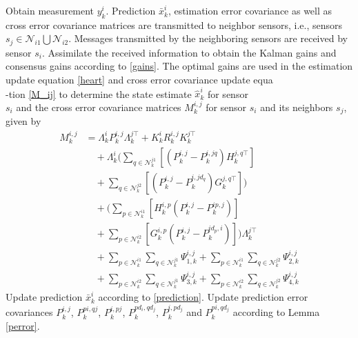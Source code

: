 \documentclass[twocolumn]{IEEEtran}
\begin{document}
\begin{algorithm}\label{filter-algorithm}
\caption{Optimal Kalman Consensus Filter for Weighted Directed Graphs (for sensor $s_i$)}
\begin{algorithmic}[1]
\STATE Obtain measurement $y_{k}^{i}$.
\STATE Prediction $\bar{x}_{k}^{i}$, estimation error covariance as well as cross error covariance matrices are transmitted to neighbor sensors, i.e., sensors $s_j \in \mathcal{N}_{i1}\bigcup\mathcal{N}_{i2}$.
\STATE Messages transmitted by the neighboring sensors are received by sensor $s_i$.
\STATE Assimilate the received information to obtain the Kalman gains and consensus gains according to \eqref{gains}.
\STATE The optimal gains are used in the estimation update equation \eqref{heart} and cross error covariance update equa\\-tion \eqref{M_ij} to determine the state estimate $\hat{x}_{k}^{i}$ for sensor\\ $s_i$ and the cross error covariance matrices $M_{k}^{i,j}$ for sensor $s_{i}$ and its neighbors $s_{j}$, given by
\begin{equation*}
\begin{split}
M_{k}^{i,j}&=\Lambda_{k}^{i}P_{k}^{i,j}\Lambda_{k}^{j\top}+K_{k}^{i}R_{k}^{i,j}K_{k}^{j\top}\\
&\quad+\Lambda_{k}^{i}(\sum_{q\in\mathcal{N}_{k}^{j1}}[(P_{k}^{i,j}-P_{k}^{i,jq})H_{k}^{j,q\top}]\\
&\quad+\sum_{q\in\mathcal{N}_{k}^{j2}}[(P_{k}^{i,j}-P_{k}^{i,jd_q})G_{k}^{j,q\top}])\\
&\quad+(\sum_{p\in\mathcal{N}_{k}^{i1}}[H_{k}^{i,p}(P_{k}^{i,j}-P_{k}^{ip,j})]\\
&\quad+\sum_{p\in\mathcal{N}_{k}^{i2}}[G_{k}^{i,p}(P_{k}^{i,j}-P_{k}^{id_ p,i})])\Lambda_{k}^{j\top}\\
&\quad+\sum_{p\in\mathcal{N}_{k}^{i1}}\sum_{q\in\mathcal{N}_{k}^{j1}}\Psi_{1,k}^{i,j}+\sum_{p\in\mathcal{N}_{k}^{i1}}\sum_{q\in\mathcal{N}_{k}^{j2}}\Psi_{2,k}^{i,j}\\
&\quad+\sum_{p\in\mathcal{N}_{k}^{i2}}\sum_{q\in\mathcal{N}_{k}^{j1}}\Psi_{3,k}^{i,j}+\sum_{p\in\mathcal{N}_{k}^{i2}}\sum_{q\in\mathcal{N}_{k}^{j2}}\Psi_{4,k}^{i,j}
\end{split}
\end{equation*}
\STATE Update prediction $\bar{x}_{k}^{i}$ according to \eqref{prediction}.
\STATE Update prediction error covariances $P_{k}^{i,j}$, $P^{pi,qj}_{k}$, $P^{i,pj}_{k}$, $P^{pd_i,qd_j}_{k}$, $P^{i,pd_j}_{k}$ and $P^{pi,qd_j}_{k}$ according to Lemma \ref{perror}.
\end{algorithmic}
\end{algorithm}
\end{document}
